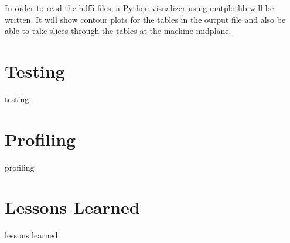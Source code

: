 \documentclass[paper=letter, fontsize=11pt]{scrartcl} %
\begin{document}
In order to read the hdf5 files, a Python visualizer using matplotlib will be written. It will show contour plots for the tables in the output file and also be able to take slices through the tables at the machine midplane.


\section{Testing}

testing


\section{Profiling}

profiling

\section{Lessons Learned}

lessons learned
\end{document}
